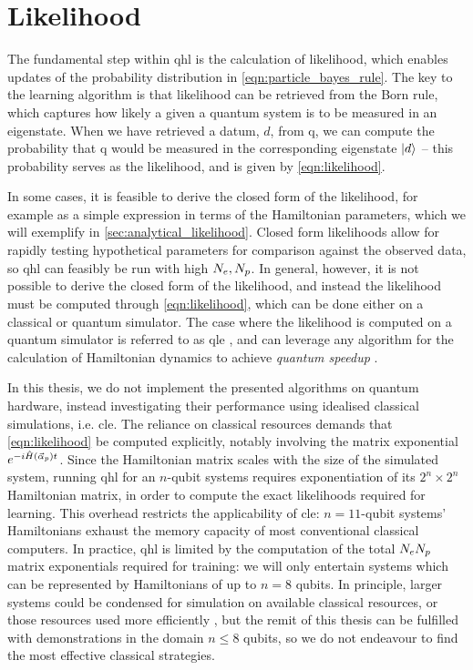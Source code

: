 \section{Likelihood}\label{sec:likelihood}
The fundamental step within \gls{qhl} is the calculation of  \gls{likelihood}, 
    which enables updates of the probability distribution in \cref{eqn:particle_bayes_rule}. 
The key to the learning algorithm is that \gls{likelihood} can be retrieved from the Born rule, 
    which captures how likely a given a quantum system is to be measured in an eigenstate.
When we have retrieved a datum, $d$, from \gls{q}, we can compute the probability that \gls{q} 
    would be measured in the corresponding eigenstate $\ket{d}$ -- this probability serves as the likelihood, 
    and is given by \cref{eqn:likelihood}.
\par 

In some cases, it is feasible to derive the closed form of the \gls{likelihood}, 
    for example as a simple expression in terms of the Hamiltonian parameters, 
    which we will exemplify in \cref{sec:analytical_likelihood}. 
Closed form likelihoods allow for rapidly testing hypothetical parameters for comparison against 
    the observed data, so \gls{qhl} can feasibly be run with high $N_e, N_p$.  
In general, however, it is not possible to derive the closed form of the likelihood, 
    and instead the \gls{likelihood} must be computed through \cref{eqn:likelihood}, 
    which can be done either on a classical or quantum simulator. 
The case where the \gls{likelihood} is computed on a quantum simulator is referred to as \gls{qle}
    \cite{Wiebe:2014qhl, wang2017experimental},
    and can leverage any algorithm for the calculation of Hamiltonian dynamics to achieve \emph{quantum speedup}
    \cite{berry2015hamiltonian, childs2018toward}. %
\par 
In this thesis, we do not implement the presented algorithms on quantum hardware,
    instead investigating their performance using idealised classical simulations, i.e. \gls{cle}. 
The reliance on classical resources demands that \cref{eqn:likelihood} be computed explicitly, 
    notably involving the matrix exponential $e^{-i\hat{H}(\vec{\alpha}_p) t}$.
Since the Hamiltonian matrix scales with the size of the simulated system,
    running \gls{qhl} for an $n$-qubit systems requires exponentiation of its $2^n \times 2^n$ Hamiltonian matrix, 
    in order to compute the exact likelihoods required for learning. 
This overhead restricts the applicability of \gls{cle}: 
    $n=11$-qubit systems' Hamiltonians exhaust the memory capacity of most conventional classical computers.
In practice, \gls{qhl} is limited by the computation of the total $N_eN_p$ matrix exponentials required for training:
    we will only entertain systems which can be represented by Hamiltonians of up to $n=8$ qubits. 
In principle, larger systems could be condensed for simulation on available classical resources, 
    or those resources used more efficiently \cite{rudi2020approximating}, 
    but the remit of this thesis can be fulfilled with demonstrations in the domain $n\leq8$ qubits, 
    so we do not endeavour to find the most effective classical strategies.
\par 

